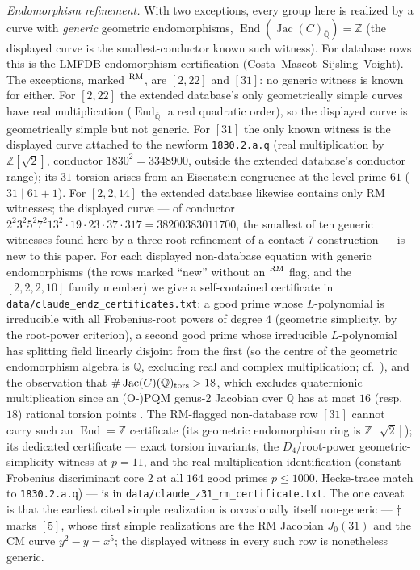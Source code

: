 \documentclass[11pt]{amsart}
\begin{document}
\emph{Endomorphism refinement.} With two exceptions, every group here is realized
by a curve with \emph{generic} geometric endomorphisms,
$\operatorname{End}(\operatorname{Jac}(C)_{\overline{\mathbb{Q}}})=\mathbb{Z}$
(the displayed curve is the smallest-conductor known such witness).  For database
rows this is the LMFDB endomorphism certification (Costa--Mascot--Sijsling--Voight).
The exceptions, marked $^{\rm RM}$, are $[2,22]$ and $[31]$: no generic witness is
known for either.  For $[2,22]$ the extended database's only geometrically simple
curves have real multiplication ($\operatorname{End}_{\overline{\mathbb{Q}}}$ a
real quadratic order), so the displayed curve is geometrically simple but not
generic.  For $[31]$ the only known witness is the displayed curve attached to
the newform \texttt{1830.2.a.q} (real multiplication by $\mathbb{Z}[\sqrt2]$,
conductor $1830^2 = 3348900$, outside the extended database's conductor range);
its $31$-torsion arises from an Eisenstein congruence at the level prime
$61$ ($31 \mid 61+1$).  For
$[2,2,14]$ the extended database likewise contains only RM witnesses; the
displayed curve --- of conductor
$2^2 3^2 5^2 7^2 13^2\cdot 19\cdot 23\cdot 37\cdot 317 = 38200383011700$, the
smallest of ten generic witnesses found here by a three-root refinement of a
contact-7 construction --- is new to this paper.
For each displayed non-database
equation with generic endomorphisms (the rows marked ``new'' without an
$^{\rm RM}$ flag, and the $[2,2,2,10]$ family member) we give a
self-contained certificate in \texttt{data/claude\_endz\_certificates.txt}: a
good prime whose $L$-polynomial is irreducible with all Frobenius-root powers of
degree $4$ (geometric simplicity, by the root-power criterion), a second good
prime whose irreducible $L$-polynomial has splitting field linearly disjoint
from the first (so the centre of the geometric endomorphism algebra is
$\mathbb{Q}$, excluding real and complex multiplication; cf.\
\cite{CLV2021,Zywina2022}), and the observation that $\#\operatorname{Jac}(C)(
\mathbb{Q})_{\rm tors}>18$, which excludes quaternionic multiplication since an
(O-)PQM genus-2 Jacobian over $\mathbb{Q}$ has at most $16$ (resp.\ $18$) rational
torsion points \cite{LSSV2024}.  The RM-flagged non-database row $[31]$ cannot
carry such an $\operatorname{End}=\mathbb{Z}$ certificate (its geometric
endomorphism ring is $\mathbb{Z}[\sqrt2]$); its dedicated certificate --- exact
torsion invariants, the $D_4$/root-power geometric-simplicity witness at
$p=11$, and the real-multiplication identification (constant Frobenius
discriminant core $2$ at all $164$ good primes $p \le 1000$, Hecke-trace match
to \texttt{1830.2.a.q}) --- is in \texttt{data/claude\_z31\_rm\_certificate.txt}.
The one caveat is that the earliest cited simple
realization is occasionally itself non-generic --- $\ddagger$ marks $[5]$, whose
first simple realizations are the RM Jacobian $J_0(31)$ and the CM curve
$y^2-y=x^5$; the displayed witness in every such row is nonetheless generic.
\medskip
\end{document}
